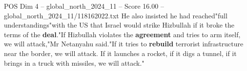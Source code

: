 \begin{textsample}{POS Dim 4 – global\_north\_2024\_11 – Score 16.00 – global\_north\_2024\_11/118162022.txt}
He also insisted he had reached"full understandings"with the US that Israel would strike Hizbullah if it broke the terms of the \textbf{deal}."If Hizbullah violates the \textbf{agreement} and tries to arm itself, we will attack,"Mr Netanyahu said."If it tries to \textbf{rebuild} terrorist infrastructure near the border, we will attack.
If it launches a rocket, if it digs a tunnel, if it brings in a truck with missiles, we will attack."

\end{textsample}
